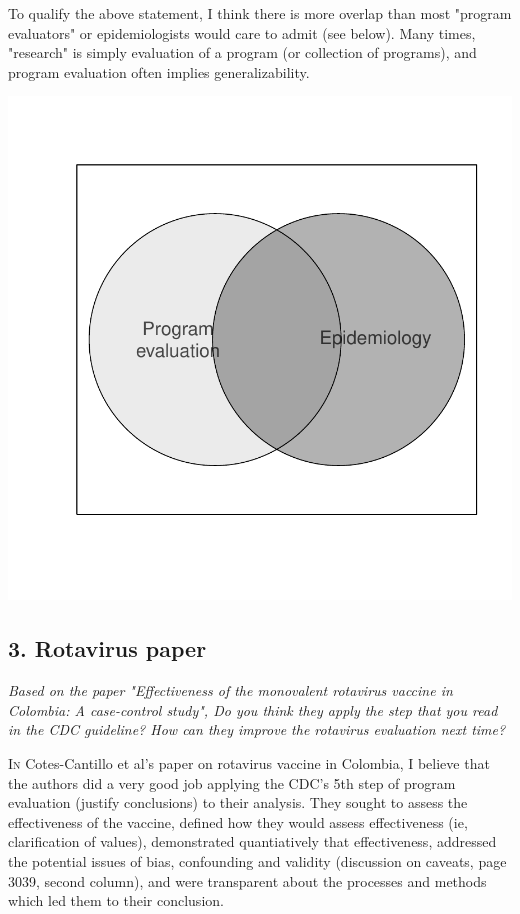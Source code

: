 \documentclass[11pt]{article}
\begin{document}
\begin{multicols}{2}
To qualify the above statement, I think there is more overlap than most "program evaluators" or epidemiologists would care to admit (see below). Many times, "research" is simply evaluation of a program (or collection of programs), and program evaluation often implies generalizability.  

\begin{center}
\includegraphics{hw5_brew-002}
\end{center}
\subsection*{3. Rotavirus paper}

\emph{Based on the paper "Effectiveness of the monovalent rotavirus vaccine in Colombia: A case-control study", Do you think they apply the step that you read in the CDC guideline? How can they improve the rotavirus evaluation next time?}

\lettrine[nindent=0em,lines=3]{I}{n} Cotes-Cantillo et al's paper on rotavirus vaccine in Colombia, I believe that the authors did a very good job applying the CDC's 5th step of program evaluation (justify conclusions) to their analysis.\cite{CotesCantillo2014}  They sought to assess the effectiveness of the vaccine, defined how they would assess effectiveness (ie, clarification of values), demonstrated quantiatively that effectiveness, addressed the potential issues of bias, confounding and validity (discussion on caveats, page 3039, second column), and were transparent about the processes and methods which led them to their conclusion.


\end{multicols}
\end{document}
